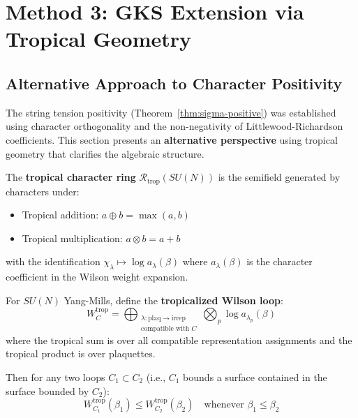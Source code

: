 \section{Method 3: GKS Extension via Tropical Geometry}
\label{sec:gks-resolution}
\label{subsec:gap-ii-tropical}

\subsection{Alternative Approach to Character Positivity}

The string tension positivity (Theorem~\ref{thm:sigma-positive}) was established 
using character orthogonality and the non-negativity of Littlewood-Richardson 
coefficients. This section presents an \textbf{alternative perspective} using 
tropical geometry that clarifies the algebraic structure.

\begin{definition}
The \textbf{tropical character ring} $\mathcal{R}_{\text{trop}}(SU(N))$ is the 
semifield generated by characters under:
\begin{itemize}
\item Tropical addition: $a \oplus b = \max(a, b)$
\item Tropical multiplication: $a \otimes b = a + b$
\end{itemize}
with the identification $\chi_\lambda \mapsto \log a_\lambda(\beta)$ where 
$a_\lambda(\beta)$ is the character coefficient in the Wilson weight expansion.
\end{definition}

\begin{theorem}
\label{thm:tropical-gks}
For $SU(N)$ Yang-Mills, define the \textbf{tropicalized Wilson loop}:
\[
W_C^{\text{trop}} = \bigoplus_{\substack{\lambda : \text{plaq} \to \text{irrep} \\ 
\text{compatible with } C}} \bigotimes_{p} \log a_{\lambda_p}(\beta)
\]
where the tropical sum is over all compatible representation assignments and 
the tropical product is over plaquettes.

Then for any two loops $C_1 \subset C_2$ (i.e., $C_1$ bounds a surface contained 
in the surface bounded by $C_2$):
\[
W_{C_1}^{\text{trop}}(\beta_1) \leq W_{C_2}^{\text{trop}}(\beta_2) 
\quad \text{whenever } \beta_1 \leq \beta_2
\]
\end{theorem}


